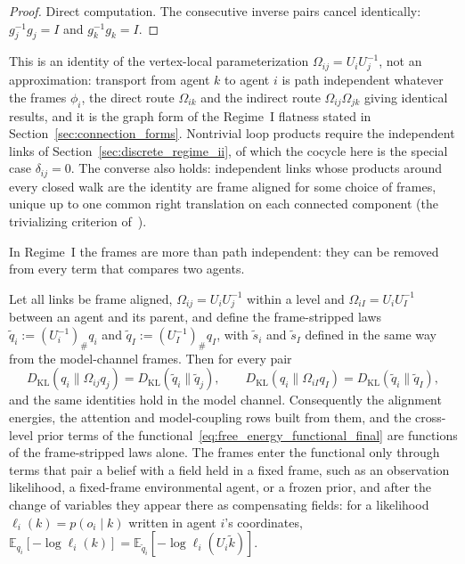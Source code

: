 \begin{proof}
Direct computation. The consecutive inverse pairs cancel identically: $g_j^{-1} g_j = I$ and $g_k^{-1} g_k = I$.
\end{proof}

This is an identity of the vertex-local parameterization $\Omega_{ij} = U_iU_j^{-1}$, not an approximation: transport from agent $k$ to agent $i$ is path independent whatever the frames $\phi_i$, the direct route $\Omega_{ik}$ and the indirect route $\Omega_{ij}\Omega_{jk}$ giving identical results, and it is the graph form of the Regime~I flatness stated in Section~\ref{sec:connection_forms}. Nontrivial loop products require the independent links of Section~\ref{sec:discrete_regime_ii}, of which the cocycle here is the special case $\delta_{ij} = 0$. The converse also holds: independent links whose products around every closed walk are the identity are frame aligned for some choice of frames, unique up to one common right translation on each connected component (the trivializing criterion of~\cite[Ch.~2]{DennisGaugeVFE2026}).

In Regime~I the frames are more than path independent: they can be removed from every term that compares two agents.

\begin{proposition}
\label{prop:regime1_removability}
Let all links be frame aligned, $\Omega_{ij} = U_iU_j^{-1}$ within a level and $\Omega_{iI} = U_iU_I^{-1}$ between an agent and its parent, and define the frame-stripped laws $\tilde q_i := (U_i^{-1})_\# q_i$ and $\tilde q_I := (U_I^{-1})_\# q_I$, with $\tilde s_i$ and $\tilde s_I$ defined in the same way from the model-channel frames. Then for every pair
\begin{equation}
D_{\mathrm{KL}}(q_i \| \Omega_{ij} q_j) = D_{\mathrm{KL}}(\tilde q_i \| \tilde q_j),
\qquad
D_{\mathrm{KL}}(q_i \| \Omega_{iI} q_I) = D_{\mathrm{KL}}(\tilde q_i \| \tilde q_I),
\label{eq:regime1_removability}
\end{equation}
and the same identities hold in the model channel. Consequently the alignment energies, the attention and model-coupling rows built from them, and the cross-level prior terms of the functional~\eqref{eq:free_energy_functional_final} are functions of the frame-stripped laws alone. The frames enter the functional only through terms that pair a belief with a field held in a fixed frame, such as an observation likelihood, a fixed-frame environmental agent, or a frozen prior, and after the change of variables they appear there as compensating fields: for a likelihood $\ell_i(k) = p(o_i \mid k)$ written in agent $i$'s coordinates, $\mathbb{E}_{q_i}[-\log \ell_i(k)] = \mathbb{E}_{\tilde q_i}[-\log \ell_i(U_i\tilde k)]$.
\end{proposition}

